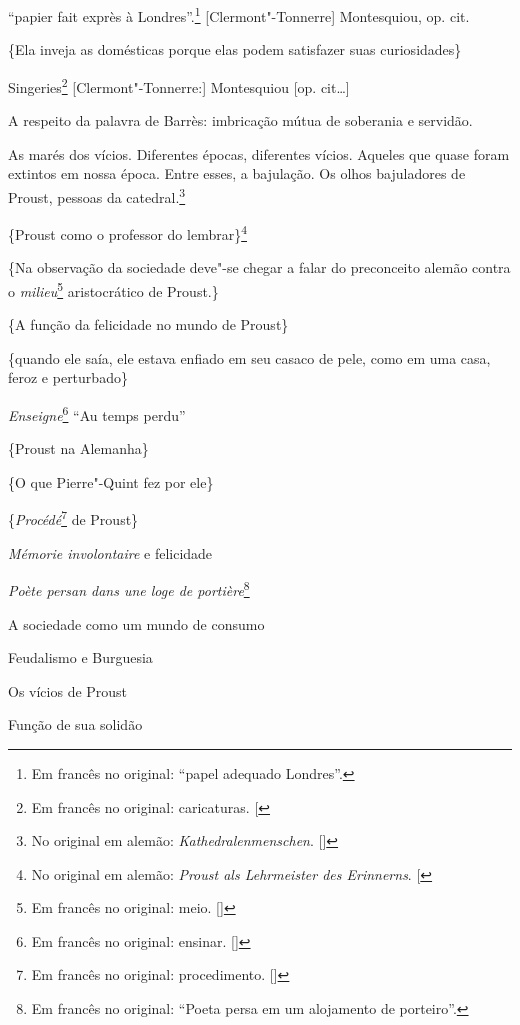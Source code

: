 ``papier fait exprès à Londres''.\footnote{Em francês no original: ``papel adequado
  Londres''. \versal{[N. T.]}} {[}Clermont"-Tonnerre{]} Montesquiou, op. cit.

\{Ela inveja as domésticas porque elas podem satisfazer suas
curiosidades\}

Singeries\footnote{Em francês no original: caricaturas. {[}\versal{N. T.}{]}} {[}Clermont"-Tonnerre:{]} Montesquiou {[}op. cit\ldots{}{]}

A respeito da palavra de Barrès: imbricação mútua de soberania e
servidão.

As marés dos vícios. Diferentes épocas, diferentes vícios. Aqueles que
quase foram extintos em nossa época. Entre esses, a bajulação. Os olhos
bajuladores de Proust, pessoas da catedral.\footnote{No original em alemão: \emph{Kathedralenmenschen}. []}

\{Proust como o professor do lembrar\}\footnote{No original em alemão: \emph{Proust als Lehrmeister des Erinnerns}. {[}\versal{N.~T.}{]}}

\{Na observação da sociedade deve"-se chegar a falar do preconceito
alemão contra o \emph{milieu}\footnote{Em francês no original: meio. []} aristocrático de Proust.\}

\{A função da felicidade no mundo de Proust\}

\{quando ele saía, ele estava enfiado em seu casaco de pele, como em uma
casa, feroz e perturbado\}

\medskip

\noindent{}\emph{Enseigne}\footnote{Em francês no original: ensinar. []} ``Au temps perdu''

\noindent{}\{Proust na Alemanha\}

\noindent{}\{O que Pierre"-Quint fez por ele\}

\noindent{}\{\emph{Procédé}\footnote{Em francês no original: procedimento. []} de Proust\}

\noindent{}\emph{Mémorie involontaire} e felicidade

\noindent{}\emph{Poète persan dans une loge de portière}\footnote{Em francês no original: ``Poeta
  persa em um alojamento de porteiro''. \versal{[N. T.]}}

\noindent{}A sociedade como um mundo de consumo

\noindent{}Feudalismo e Burguesia

\noindent{}Os vícios de Proust

\noindent{}Função de sua solidão

